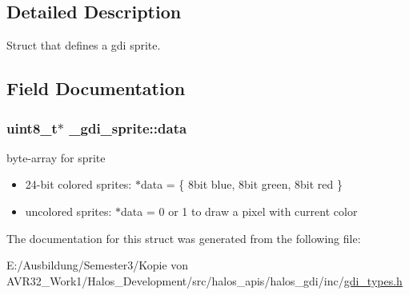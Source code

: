 \subsection{Detailed Description}
Struct that defines a gdi sprite. 

\subsection{Field Documentation}
\hypertarget{struct__gdi__sprite_a6abd9b710c9d6511bdd300879274a43}{
\subsubsection[{data}]{\setlength{\rightskip}{0pt plus 5cm}uint8\_\-t$\ast$ {\bf \_\-gdi\_\-sprite::data}}}
\label{struct__gdi__sprite_a6abd9b710c9d6511bdd300879274a43}


byte-array for sprite 

\begin{itemize}
\item 24-bit colored sprites: $\ast$data = \{ 8bit blue, 8bit green, 8bit red \} \item uncolored sprites: $\ast$data = 0 or 1 to draw a pixel with current color \end{itemize}


The documentation for this struct was generated from the following file:\begin{CompactItemize}
\item 
E:/Ausbildung/Semester3/Kopie von AVR32\_\-Work1/Halos\_\-Development/src/halos\_\-apis/halos\_\-gdi/inc/\hyperlink{gdi__types_8h}{gdi\_\-types.h}\end{CompactItemize}
